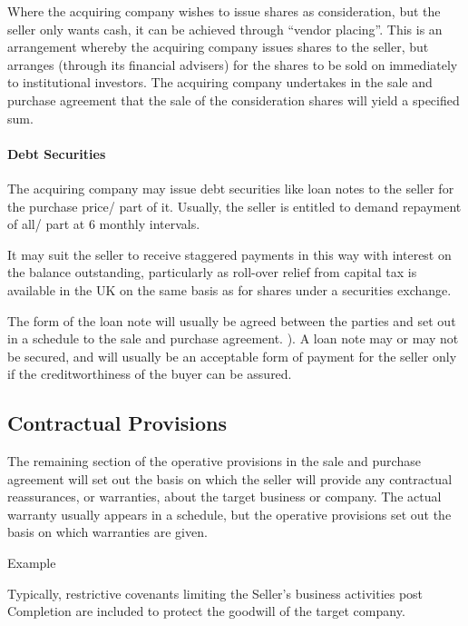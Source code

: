 \documentclass[
]{article}
\newenvironment{env-c5a21b51-dc78-4e82-bd56-c0130c2151f9}
{
    \savenotes\tcolorbox[blanker,breakable,left=5pt,borderline west={2pt}{-4pt}{purple}]
}
{
    \endtcolorbox\spewnotes
}
\begin{document}
Where the acquiring company wishes to issue shares as consideration, but
the seller only wants cash, it can be achieved through ``vendor
placing''. This is an arrangement whereby the acquiring company issues
shares to the seller, but arranges (through its financial advisers) for
the shares to be sold on immediately to institutional investors. The
acquiring company undertakes in the sale and purchase agreement that the
sale of the consideration shares will yield a specified sum.

\hypertarget{debt-securities}{%
\paragraph{Debt Securities}\label{debt-securities}}

The acquiring company may issue debt securities like loan notes to the
seller for the purchase price/ part of it. Usually, the seller is
entitled to demand repayment of all/ part at 6 monthly intervals.

It may suit the seller to receive staggered payments in this way with
interest on the balance outstanding, particularly as roll-over relief
from capital tax is available in the UK on the same basis as for shares
under a securities exchange.

The form of the loan note will usually be agreed between the parties and
set out in a schedule to the sale and purchase agreement. ). A loan note
may or may not be secured, and will usually be an acceptable form of
payment for the seller only if the creditworthiness of the buyer can be
assured.

\hypertarget{contractual-provisions}{%
\subsection{Contractual Provisions}\label{contractual-provisions}}

The remaining section of the operative provisions in the sale and
purchase agreement will set out the basis on which the seller will
provide any contractual reassurances, or warranties, about the target
business or company. The actual warranty usually appears in a schedule,
but the operative provisions set out the basis on which warranties are
given.

\begin{env-c5a21b51-dc78-4e82-bd56-c0130c2151f9}

Example

Typically, restrictive covenants limiting the Seller's business
activities post Completion are included to protect the goodwill of the
target company.

\end{env-c5a21b51-dc78-4e82-bd56-c0130c2151f9}
\end{document}
